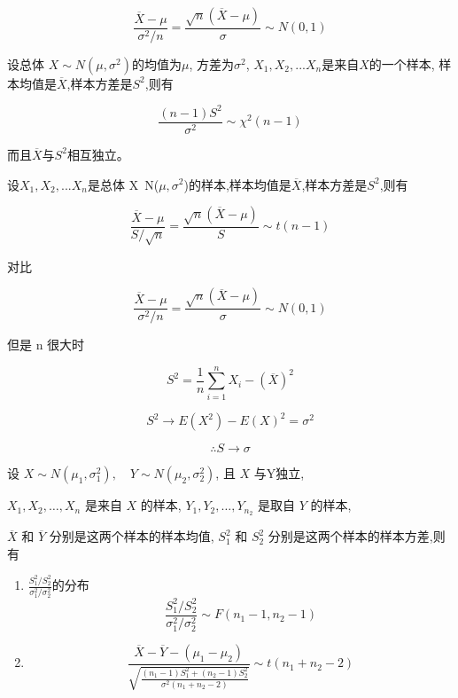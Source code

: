 \begin{corollary}
    $$
        \frac{\overline{X}-\mu}{\sigma^2/n} = \frac{\sqrt{n}(\overline{X}-\mu)}{\sigma} \sim N(0,1)
    $$
\end{corollary}

\begin{theorem}[样本方差的分布]
    设总体 $X\sim N(\mu,\sigma^2)$的均值为$\mu$, 方差为$σ^2$, $X_1,X_2,...X_n$是来自$X$的一个样本, 样本均值是$\overline{X}$,样本方差是$S^2$,则有

    $$
        { \frac{(n-1)S^2}{\sigma^2} \sim \chi^2(n-1)}
    $$

    而且$\overline{X}$与$S^2$相互独立。
\end{theorem}

\begin{theorem}[样本均值和样本方差的关系]
    设$X_1,X_2,...X_n$是总体 X~N($\mu,\sigma^2$)的样本,样本均值是$\overline{X}$,样本方差是$S^2$,则有

    $$
        {\frac{\overline{X}-\mu}{S / \sqrt{n}} = \frac{\sqrt{n}(\overline{X} - \mu)}{{ S}} \sim t(n-1)}
    $$

    对比

    $$
        \frac{\overline{X}-\mu}{\sigma^2/n} = \frac{\sqrt{n}(\overline{X}-\mu)}{{ \sigma}} \sim N(0,1)
    $$

    但是 n 很大时

    $$
        S^2 = \frac{1}{n} \sum_{i=1}^n X_i - (\overline{X})^2
    $$

    $$
        S^2 \to E(X^2) - E(X)^2= \sigma^2
    $$

    $$
        \therefore S \to \sigma
    $$
\end{theorem}

\begin{theorem}
    设 $ X \sim N\left(\mu_{1}, \sigma_{1}^{2}\right), \quad Y \sim N\left(\mu_{2}, \sigma_{2}^{2}\right) $, 且 $ X $ 与Y独立,

    $ X_{1}, X_{2}, \ldots, X_{n} $ 是来自 $ X $ 的样本, $ Y_{1}, Y_{2}, \ldots, Y_{n_{2}} $ 是取自 $ Y $ 的样本,

    $ \overline{{X}} $ 和 $ \overline{{Y}} $ 分别是这两个样本的样本均值, $ {S}_{1}^{2} $ 和 $ {S}_{2}^{2} $ 分别是这两个样本的样本方差,则有

    \begin{enumerate}
        \item $\frac{S_1^2/S^2_2}{\sigma_1^2 / \sigma_2^2}$的分布
              $$
                  {
                          \frac{S_1^2/S^2_2}{\sigma_1^2 / \sigma_2^2} \sim F(n_1 - 1, n_2 -1)}
              $$
        \item $$
                  \frac{\overline{X} - \overline{Y}- (\mu_1 - \mu_2 )}{\sqrt{ \frac{(n_1 - 1) S_1^2 + (n_2 - 1 ) S_2^2 }{\sigma^2 (n_1+n_2-2)} }} \sim t(n_1+n_2-2)
              $$
    \end{enumerate}

\end{theorem}

